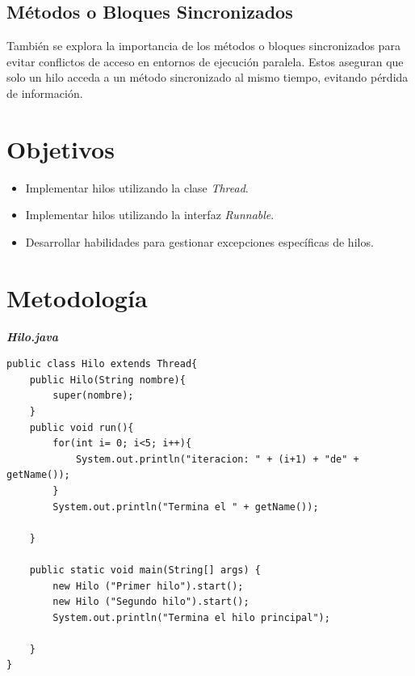 \documentclass[11pt, twocolumn]{article}
\begin{document}
  \subsection*{Métodos o Bloques Sincronizados}
  También se explora la importancia de los métodos o bloques sincronizados para evitar conflictos de acceso en entornos de ejecución paralela. Estos aseguran que solo un hilo acceda a un método sincronizado al mismo tiempo, evitando pérdida de información.

  \section*{Objetivos}
  \begin{itemize}
    \item Implementar hilos utilizando la clase \textit{Thread}. 
    \item Implementar hilos utilizando la interfaz \textit{Runnable}.
    \item Desarrollar habilidades para gestionar excepciones específicas de hilos.
  \end{itemize}

  \section*{Metodología}
  \textit{\textbf{Hilo.java}}
  \begin{lstlisting}
public class Hilo extends Thread{
	public Hilo(String nombre){
		super(nombre);
	}
	public void run(){
		for(int i= 0; i<5; i++){
			System.out.println("iteracion: " + (i+1) + "de" + getName());
		}
		System.out.println("Termina el " + getName());

	}

	public static void main(String[] args) {
		new Hilo ("Primer hilo").start();
		new Hilo ("Segundo hilo").start();
		System.out.println("Termina el hilo principal");
		
	}
}
  \end{lstlisting}
\end{document}
